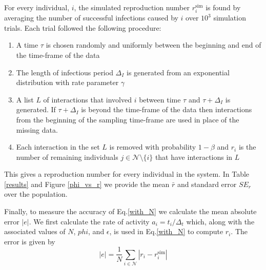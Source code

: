 \documentclass[10pt]{article}
\begin{document}
\begin{multicols}{2}
For every individual, $i$, the simulated reproduction number $r_{i}^{\text{sim}}$ is found by averaging the number of successful infections caused by $i$ over $10^{3}$ simulation trials. Each trial followed the following procedure:
\begin{enumerate}
\item A time $\tau$ is chosen randomly and uniformly between the beginning and end of the time-frame of the data
\item The length of infectious period $\Delta_{I}$ is generated from an exponential distribution with rate parameter $\gamma$
\item A list $L$ of interactions that involved $i$ between time $\tau$ and $\tau+\Delta_{I}$ is generated. If $\tau+\Delta_{I}$ is beyond the time-frame of the data then interactions from the beginning of the sampling time-frame are used in place of the missing data. 
\item Each interaction in the set $L$ is removed with probability $1-\beta$ and $r_{i}$ is the number of remaining individuals $j\in\mathcal{N}\setminus\{i\}$ that have interactions in $L$ 
\end{enumerate}
This gives a reproduction number for every individual in the system. In Table \ref{results} and Figure \ref{phi_vs_r} we provide the mean $\bar{r}$ and standard error $SE_{r}$ over the population. 

Finally, to measure the accuracy of Eq.\eqref{with_N} we calculate the mean absolute error $|e|$. We first calculate the rate of activity $a_{i}=t_{i}/\Delta_{t}$ which, along with the associated values of $N$, $phi$, and $\epsilon$, is used in Eq.\eqref{with_N} to compute $r_{i}$. The error is given by 
\begin{equation}
|e|=\frac{1}{N}\sum_{i\in\mathcal{N}}|r_{i}-r_{i}^{\text{sim}}|
\end{equation}


\end{multicols}
\end{document}
